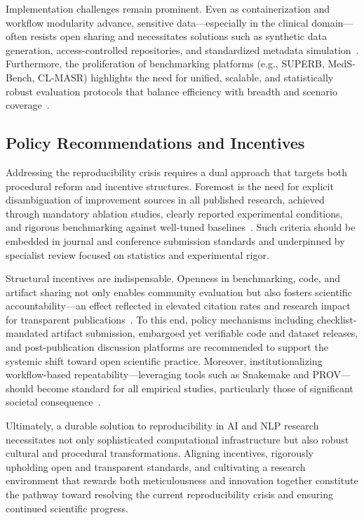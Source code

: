 Implementation challenges remain prominent. Even as containerization and workflow modularity advance, sensitive data---especially in the clinical domain---often resists open sharing and necessitates solutions such as synthetic data generation, access-controlled repositories, and standardized metadata simulation~\cite{ref108}. Furthermore, the proliferation of benchmarking platforms (e.g., SUPERB, MedS-Bench, CL-MASR) highlights the need for unified, scalable, and statistically robust evaluation protocols that balance efficiency with breadth and scenario coverage~\cite{ref94,ref95,ref106}.

\subsection{Policy Recommendations and Incentives}

Addressing the reproducibility crisis requires a dual approach that targets both procedural reform and incentive structures. Foremost is the need for explicit disambiguation of improvement sources in all published research, achieved through mandatory ablation studies, clearly reported experimental conditions, and rigorous benchmarking against well-tuned baselines~\cite{ref107,ref108}. Such criteria should be embedded in journal and conference submission standards and underpinned by specialist review focused on statistics and experimental rigor.

Structural incentives are indispensable. Openness in benchmarking, code, and artifact sharing not only enables community evaluation but also fosters scientific accountability---an effect reflected in elevated citation rates and research impact for transparent publications~\cite{ref94,ref95,ref106,ref108}. To this end, policy mechanisms including checklist-mandated artifact submission, embargoed yet verifiable code and dataset releases, and post-publication discussion platforms are recommended to support the systemic shift toward open scientific practice. Moreover, institutionalizing workflow-based repeatability---leveraging tools such as Snakemake and PROV---should become standard for all empirical studies, particularly those of significant societal consequence~\cite{ref12,ref13,ref24,ref25,ref28,ref29,ref32,ref33,ref34,ref39,ref44,ref46,ref50,ref58,ref65,ref66,ref67,ref71,ref81,ref82,ref87,ref92,ref93,ref94,ref95,ref101,ref102,ref104,ref105,ref106,ref107,ref108}.

Ultimately, a durable solution to reproducibility in AI and NLP research necessitates not only sophisticated computational infrastructure but also robust cultural and procedural transformations. Aligning incentives, rigorously upholding open and transparent standards, and cultivating a research environment that rewards both meticulousness and innovation together constitute the pathway toward resolving the current reproducibility crisis and ensuring continued scientific progress.

